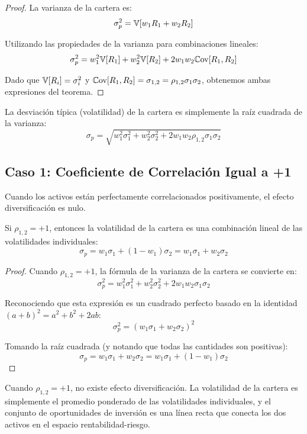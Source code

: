 \begin{proof}
La varianza de la cartera es:
$$\sigma_p^2 = \mathbb{V}[w_1 R_1 + w_2 R_2]$$

Utilizando las propiedades de la varianza para combinaciones lineales:
$$\sigma_p^2 = w_1^2 \mathbb{V}[R_1] + w_2^2 \mathbb{V}[R_2] + 2w_1 w_2 \mathbb{C}\text{ov}[R_1, R_2]$$

Dado que $\mathbb{V}[R_i] = \sigma_i^2$ y $\mathbb{C}\text{ov}[R_1, R_2] = \sigma_{1,2} = \rho_{1,2} \sigma_1 \sigma_2$, obtenemos ambas expresiones del teorema.
\end{proof}

La desviación típica (volatilidad) de la cartera es simplemente la raíz cuadrada de la varianza:
\begin{equation}
\sigma_p = \sqrt{w_1^2 \sigma_1^2 + w_2^2 \sigma_2^2 + 2w_1 w_2 \rho_{1,2} \sigma_1 \sigma_2}
\end{equation}

\subsection{Caso 1: Coeficiente de Correlación Igual a +1}

Cuando los activos están perfectamente correlacionados positivamente, el efecto diversificación es nulo.

\begin{teorema}
Si $\rho_{1,2} = +1$, entonces la volatilidad de la cartera es una combinación lineal de las volatilidades individuales:
\begin{equation}
\sigma_p = w_1 \sigma_1 + (1 - w_1) \sigma_2 = w_1 \sigma_1 + w_2 \sigma_2
\end{equation}
\end{teorema}

\begin{proof}
Cuando $\rho_{1,2} = +1$, la fórmula de la varianza de la cartera se convierte en:
$$\sigma_p^2 = w_1^2 \sigma_1^2 + w_2^2 \sigma_2^2 + 2w_1 w_2 \sigma_1 \sigma_2$$

Reconociendo que esta expresión es un cuadrado perfecto basado en la identidad $(a + b)^2 = a^2 + b^2 + 2ab$:
$$\sigma_p^2 = (w_1 \sigma_1 + w_2 \sigma_2)^2$$

Tomando la raíz cuadrada (y notando que todas las cantidades son positivas):
$$\sigma_p = w_1 \sigma_1 + w_2 \sigma_2 = w_1 \sigma_1 + (1 - w_1) \sigma_2$$
\end{proof}

\begin{proposicion}
Cuando $\rho_{1,2} = +1$, no existe efecto diversificación. La volatilidad de la cartera es simplemente el promedio ponderado de las volatilidades individuales, y el conjunto de oportunidades de inversión es una línea recta que conecta los dos activos en el espacio rentabilidad-riesgo.
\end{proposicion}

